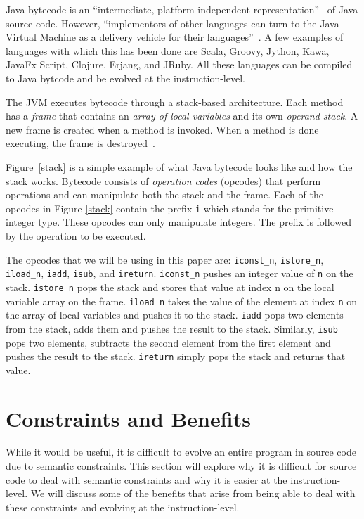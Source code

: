 \documentclass{sig-alternate}
\begin{document}
Java bytecode is an ``intermediate, platform-independent representation''~\cite{FINCH2:2009} of Java source code. However, ``implementors of other languages can turn to the Java Virtual Machine as a delivery vehicle for their languages''~\cite{JVMspec:2013}. A few examples of languages with which this has been done are Scala, Groovy, Jython, Kawa, JavaFx Script, Clojure, Erjang, and JRuby. All these languages can be compiled to Java bytcode and be evolved at the instruction-level. \par

The JVM executes bytecode through a stack-based architecture. Each method has a \textit{frame} that contains an \textit{array of local variables} and its own \textit{operand stack}. A new frame is created when a method is invoked. When a method is done executing, the frame is destroyed~\cite{Oracle:2013}.

Figure~\ref{stack} is a simple example of what Java bytecode looks like and how the stack works. Bytecode consists of \textit{operation codes} (opcodes) that perform operations and can manipulate both the stack and the frame. Each of the opcodes in Figure \ref{stack} contain the prefix \texttt{i} which stands for the primitive integer type. These opcodes can only manipulate integers. The prefix is followed by the operation to be executed.\par 

The opcodes that we will be using in this paper are: \texttt{iconst\_n}, \texttt{istore\_n}, \texttt{iload\_n}, \texttt{iadd}, \texttt{isub}, and \texttt{ireturn}. \texttt{iconst\_n} pushes an integer value of \texttt{n} on the stack. \texttt{istore\_n} pops the stack and stores that value at index n on the local variable array on the frame. \texttt{iload\_n} takes the value of the element at index \texttt{n} on the array of local variables and pushes it to the stack. \texttt{iadd} pops two elements from the stack, adds them and pushes the result to the stack. Similarly, \texttt{isub} pops two elements, subtracts the second element from the first element and pushes the result to the stack. \texttt{ireturn} simply pops the stack and returns that value.


\section{Constraints and Benefits}

While it would be useful, it is difficult to evolve an entire program in source code due to semantic constraints. This section will explore why it is difficult for source code to deal with semantic constraints and why it is easier at the instruction-level. We will discuss some of the benefits that arise from being able to deal with these constraints and evolving at the instruction-level.
\end{document}
